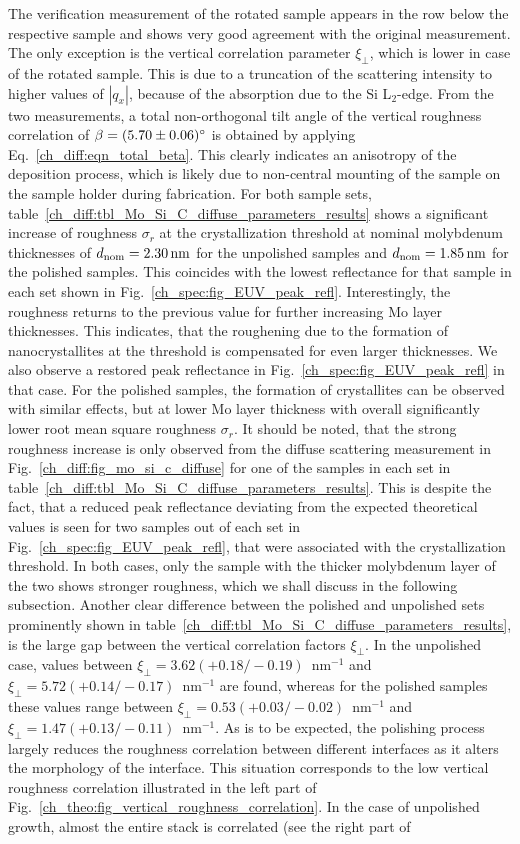 The verification measurement of the rotated sample appears in the row below the respective sample and shows very good agreement with the original measurement. The only exception is the vertical correlation parameter $\xi_\perp$, which is lower in case of the rotated sample. This is due to a truncation of the scattering intensity to higher values of $|q_x|$, because of the absorption due to the Si L$_2$-edge. From the two measurements, a total non-orthogonal tilt angle of the vertical roughness correlation of $\beta = \SI{5.70\pm 0.06}{\degree}$ is obtained by applying Eq.~\eqref{ch_diff:eqn_total_beta}. This clearly indicates an anisotropy of the deposition process, which is likely due to non-central mounting of the sample on the sample holder during fabrication. For both sample sets, table~\ref{ch_diff:tbl_Mo_Si_C_diffuse_parameters_results} shows a significant increase of roughness $\sigma_r$ at the crystallization threshold at nominal molybdenum thicknesses of $d_\text{nom}=\nm{2.30}$ for the unpolished samples and $d_\text{nom}=\nm{1.85}$ for the polished samples. This coincides with the lowest reflectance for that sample in each set shown in Fig.~\ref{ch_spec:fig_EUV_peak_refl}. Interestingly, the roughness returns to the previous value for further increasing Mo layer thicknesses. This indicates, that the roughening due to the formation of nanocrystallites at the threshold is compensated for even larger thicknesses. We also observe a restored peak reflectance in Fig.~\ref{ch_spec:fig_EUV_peak_refl} in that case. For the polished samples, the formation of crystallites can be observed with similar effects, but at lower Mo layer thickness with overall significantly lower root mean square roughness $\sigma_r$. It should be noted, that the strong roughness increase is only observed from the diffuse scattering measurement in Fig.~\ref{ch_diff:fig_mo_si_c_diffuse} for one of the samples in each set in table~\ref{ch_diff:tbl_Mo_Si_C_diffuse_parameters_results}. This is despite the fact, that a reduced peak reflectance deviating from the expected theoretical values is seen for two samples out of each set in Fig.~\ref{ch_spec:fig_EUV_peak_refl}, that were associated with the crystallization threshold. In both cases, only the sample with the thicker molybdenum layer of the two shows stronger roughness, which we shall discuss in the following subsection. Another clear difference between the polished and unpolished sets prominently shown in table~\ref{ch_diff:tbl_Mo_Si_C_diffuse_parameters_results}, is the large gap between the vertical correlation factors $\xi_\perp$. In the unpolished case, values between $\xi_\perp=3.62(+ 0.18/- 0.19)$~nm$^{-1}$ and $\xi_\perp=5.72(+ 0.14/- 0.17)$~nm$^{-1}$ are found, whereas for the polished samples these values range between $\xi_\perp=0.53(+ 0.03/- 0.02)$~nm$^{-1}$ and $\xi_\perp=1.47(+ 0.13/- 0.11)$~nm$^{-1}$. As is to be expected, the polishing process largely reduces the roughness correlation between different interfaces as it alters the morphology of the interface. This situation corresponds to the low vertical roughness correlation illustrated in the left part of Fig.~\ref{ch_theo:fig_vertical_roughness_correlation}. In the case of unpolished growth, almost the entire stack is correlated (see the right part of 